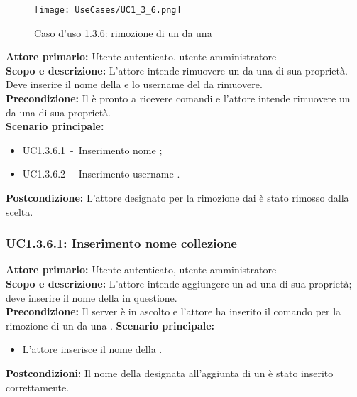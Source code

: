 \documentclass{scalatekids-article}
\begin{document}
\begin{figure}[H]
  \begin{center}
    \texttt{[image: UseCases/UC1\_3\_6.png]}
    \caption{Caso d'uso 1.3.6: rimozione di un  da una }
  \end{center}
\end{figure}
\textbf{Attore primario:} Utente autenticato, utente amministratore\\
\textbf{Scopo e descrizione:} L'attore intende rimuovere un  da una  di sua proprietà. Deve inserire il nome della  e lo username del  da rimuovere.\\
\textbf{Precondizione:} Il  è pronto a ricevere comandi e l'attore intende rimuovere un  da una  di sua proprietà.\\
\textbf{Scenario principale:}
\begin{itemize}
\item UC1.3.6.1\ -\ Inserimento nome ;
\item UC1.3.6.2\ -\ Inserimento username .
\end{itemize}
\textbf{Postcondizione:} L'attore designato per la rimozione dai  è stato rimosso dalla  scelta.

\subsubsection{UC1.3.6.1: Inserimento nome collezione}

\textbf{Attore primario:} Utente autenticato, utente amministratore\\
\textbf{Scopo e descrizione:} L'attore intende aggiungere un  ad una  di sua proprietà; deve inserire il nome della  in questione.\\
\textbf{Precondizione:} Il server è in ascolto e l'attore ha inserito il comando per la rimozione di un  da una .
\textbf{Scenario principale:}
\begin{itemize}
\item L'attore inserisce il nome della .
\end{itemize}
\textbf{Postcondizioni:} Il nome della  designata all'aggiunta di un  è stato inserito correttamente.
\end{document}
